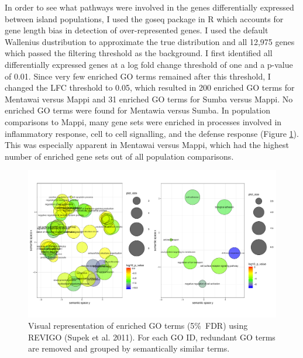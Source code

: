 \documentclass[12pt,a4paper,titlepage,twoside,openright]{book}
\begin{document}
\begin{mainmatter}
{In order to see what pathways were involved in the genes differentially expressed between island populations, I used the goseq package in R which accounts for gene length bias in 
detection of over-represented genes. I used the default Wallenius dustribution to approximate the true distribution and all 12,975 genes which passed the filtering threshold as the background. I first identified all differentially expressed genes at a log fold change threshold of one and a p-value of 0.01. Since very few enriched GO terms remained after this threshold, I changed the LFC threshold to 0.05, which resulted in 200 enriched GO terms for Mentawai versus Mappi and 31 enriched GO terms for Sumba versus Mappi. No enriched GO terms were found for Mentawia versus Sumba. In population comparisons to Mappi, many gene sets were enriched in processes involved in inflammatory response, cell to cell signalling, and the defense response (Figure \ref{fig:Revigo}). This was especially apparent in Mentawai versus Mappi, which had the highest number of enriched gene sets out of all population comparisons. 

\begin{figure}[htb!]
\centering
\includegraphics[width=\textwidth,height=\textheight,keepaspectratio]{Figures/RevigoPlots.pdf}
\caption{Visual representation of enriched GO terms (5\%\ FDR) using REVIGO (Supek et al. 2011).  For each GO ID, redundant GO terms are removed and grouped by semantically similar terms.}
\label{fig:Revigo}
\end{figure}

}
\end{mainmatter}
\end{document}
